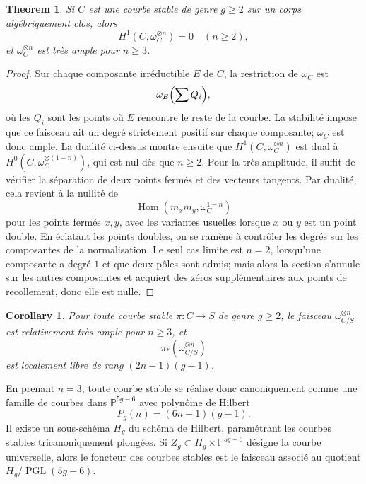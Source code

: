 \documentclass[11pt]{article}
\DeclareMathOperator{\Hom}{Hom}
\DeclareMathOperator{\PGL}{PGL}
\theoremstyle{plain}
\newtheorem*{theorem*}{Theorem}
\newtheorem*{corollary*}{Corollary}
\theoremstyle{definition}
\theoremstyle{remark}
\begin{document}
\begin{theorem*}
Si \(C\) est une courbe stable de genre \(g\geq 2\) sur un corps algébriquement clos, alors
\[
 H^1(C,\omega_C^{\otimes n})=0 \quad (n\geq 2),
\]
et \(\omega_C^{\otimes n}\) est très ample pour \(n\geq 3\).
\end{theorem*}

\begin{proof}
Sur chaque composante irréductible \(E\) de \(C\), la restriction de \(\omega_C\) est
\[
 \omega_E\Bigl(\sum Q_i\Bigr),
\]
où les \(Q_i\) sont les points où \(E\) rencontre le reste de la courbe. La stabilité impose que ce faisceau ait un degré strictement positif sur chaque composante; \(\omega_C\) est donc ample. La dualité ci-dessus montre ensuite que \(H^1(C,\omega_C^{\otimes n})\) est dual à \(H^0(C,\omega_C^{\otimes(1-n)})\), qui est nul dès que \(n\geq 2\). Pour la très-amplitude, il suffit de vérifier la séparation de deux points fermés et des vecteurs tangents. Par dualité, cela revient à la nullité de
\[
 \Hom(m_xm_y,\omega_C^{1-n})
\]
pour les points fermés \(x,y\), avec les variantes usuelles lorsque \(x\) ou \(y\) est un point double. En éclatant les points doubles, on se ramène à contrôler les degrés sur les composantes de la normalisation. Le seul cas limite est \(n=2\), lorsqu'une composante a degré \(1\) et que deux pôles sont admis; mais alors la section s'annule sur les autres composantes et acquiert des zéros supplémentaires aux points de recollement, donc elle est nulle.
\end{proof}

\begin{corollary*}
Pour toute courbe stable \(\pi:C\to S\) de genre \(g\geq 2\), le faisceau \(\omega_{C/S}^{\otimes n}\) est relativement très ample pour \(n\geq 3\), et
\[
 \pi_*(\omega_{C/S}^{\otimes n})
\]
est localement libre de rang \((2n-1)(g-1)\).
\end{corollary*}

En prenant \(n=3\), toute courbe stable se réalise donc canoniquement comme une famille de courbes dans \(\mathbb P^{5g-6}\) avec polynôme de Hilbert
\[
 P_g(n)=(6n-1)(g-1).
\]
Il existe un sous-schéma \(H_g\) du schéma de Hilbert, paramétrant les courbes stables tricanoniquement plongées. Si \(Z_g\subset H_g\times \mathbb P^{5g-6}\) désigne la courbe universelle, alors le foncteur des courbes stables est le faisceau associé au quotient \(H_g/\PGL(5g-6)\).
\end{document}
